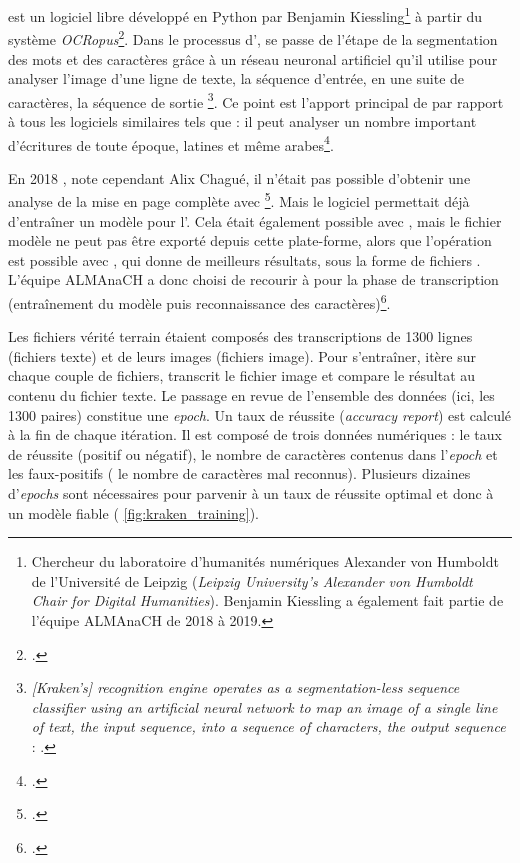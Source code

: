 \kraken{} est un logiciel libre développé en Python par Benjamin Kiessling\footnote{Chercheur du laboratoire d'humanités numériques \og Alexander von Humboldt \fg{} de l'Université de Leipzig (\textit{Leipzig  University’s  Alexander  von  Humboldt  Chair for Digital Humanities}). Benjamin Kiessling a également fait partie de l'équipe ALMAnaCH de 2018 à 2019.} à partir du système \textit{OCRopus}\footcite{kiessling}. Dans le processus d'\ocr, \kraken{} se passe de l'étape de la segmentation des mots et des caractères grâce à un \og réseau neuronal artificiel \fg{} qu'il utilise \og pour analyser l'image d'une ligne de texte, la séquence d'entrée, en une suite de caractères, la séquence de sortie \fg{}\footnote{\og \textit{[Kraken's] recognition engine operates as a segmentation-less sequence classifier using an artificial neural network to map an image of a single line of text, the input sequence, into a sequence of characters, the output sequence} : \cite{kiessling}.}. Ce point est l'apport principal de \kraken{} par rapport à tous les logiciels similaires tels que \transkribus{} : il peut analyser un nombre important d'écritures de toute époque, latines et même arabes\footcite{kiesslingarabe}.

\og En 2018 \fg, note cependant Alix Chagué, \og il n’était pas possible d’obtenir une analyse de la mise en page complète avec \kraken \fg{}\footcite{chague2}. Mais le logiciel permettait déjà d'entraîner un modèle pour l'\ocr. Cela était également possible avec \transkribus, mais le fichier modèle ne peut pas être exporté depuis cette plate-forme, alors que l'opération est possible avec \kraken{}, qui donne de meilleurs résultats, sous la forme de fichiers . L'équipe ALMAnaCH a donc choisi de recourir à \kraken{} pour la phase de transcription (entraînement du modèle puis reconnaissance des caractères)\footcite{chague2}.

Les fichiers \og vérité terrain \fg{} étaient composés des transcriptions de 1300 lignes (fichiers texte) et de leurs images (fichiers image). Pour s'entraîner, \kraken{} itère sur chaque couple de fichiers, transcrit le fichier image et compare le résultat au contenu du fichier texte. Le passage en revue de l'ensemble des données (ici, les 1300 paires) constitue une \textit{epoch}. Un taux de réussite (\textit{accuracy report}) est calculé à la fin de chaque itération. Il est composé de trois données numériques : le taux de réussite (positif ou négatif), le nombre de caractères contenus dans l'\textit{epoch} et les faux-positifs (\cad{} le nombre de caractères mal reconnus). Plusieurs dizaines d'\textit{epochs} sont nécessaires pour parvenir à un taux de réussite optimal et donc à un modèle fiable (\fig{} \ref{fig:kraken_training}).

